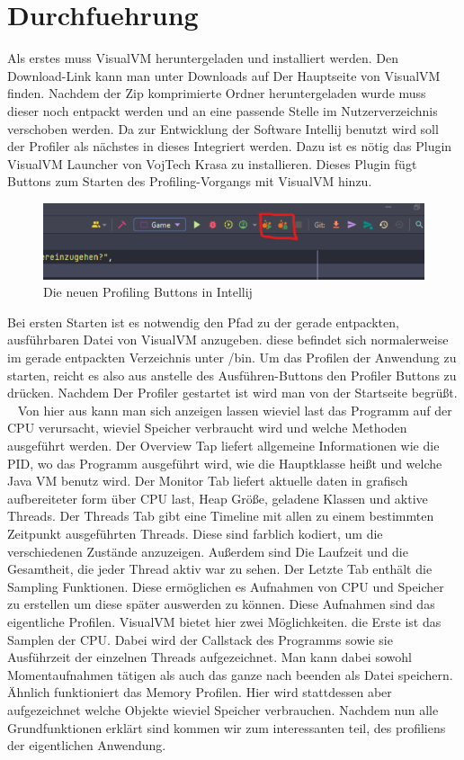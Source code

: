 \documentclass{article}
\begin{document}
\section{Durchfuehrung}
Als erstes muss VisualVM heruntergeladen und installiert werden. Den Download-Link kann man unter Downloads auf Der Hauptseite von VisualVM finden. Nachdem der Zip komprimierte Ordner heruntergeladen wurde muss dieser noch entpackt werden und an eine passende Stelle im Nutzerverzeichnis verschoben werden. Da zur Entwicklung der Software Intellij benutzt wird soll der Profiler als nächstes in dieses Integriert werden. Dazu ist es nötig das Plugin VisualVM Launcher von VojTech Krasa zu installieren. Dieses Plugin fügt Buttons zum Starten des Profiling-Vorgangs mit VisualVM hinzu. ~\cite{fig:Intellij_VisualVM_Button}
\begin{figure}[t]
  \centering
  \includegraphics{Intellij_VisualVM_Button}
  \caption{Die neuen Profiling Buttons in Intellij}
  \label{fig:Intellij_VisualVM_Button}
\end{figure}
Bei ersten Starten ist es notwendig den Pfad zu der gerade entpackten, ausführbaren Datei von VisualVM anzugeben. diese befindet sich normalerweise im gerade entpackten Verzeichnis unter /bin. Um das Profilen der Anwendung zu starten, reicht es also aus anstelle des Ausführen-Buttons den Profiler Buttons zu drücken. Nachdem Der Profiler gestartet ist wird man von der Startseite begrüßt. ~\cite{fig:VisualVM_MainPage} Von hier aus kann man sich anzeigen lassen wieviel last das Programm auf der CPU verursacht, wieviel Speicher verbraucht wird und welche Methoden ausgeführt werden. Der Overview Tap liefert allgemeine Informationen wie die PID, wo das Programm ausgeführt wird, wie die Hauptklasse heißt und welche Java 
VM benutz wird. Der Monitor Tab liefert aktuelle daten in grafisch aufbereiteter form über CPU last, Heap Größe, geladene Klassen und aktive Threads.
Der Threads Tab gibt eine Timeline mit allen zu einem bestimmten Zeitpunkt ausgeführten Threads. Diese sind farblich kodiert, um die verschiedenen Zustände anzuzeigen. Außerdem sind Die Laufzeit und die Gesamtheit, die jeder Thread aktiv war zu sehen. Der Letzte Tab enthält die Sampling Funktionen. Diese ermöglichen es Aufnahmen von CPU und Speicher zu erstellen um diese später auswerden zu können. Diese Aufnahmen sind das eigentliche Profilen. VisualVM bietet hier zwei Möglichkeiten. die Erste ist das Samplen der CPU. Dabei wird der Callstack des Programms sowie sie Ausführzeit der einzelnen Threads aufgezeichnet. Man kann dabei sowohl Momentaufnahmen tätigen als auch das ganze nach beenden als Datei speichern. Ähnlich funktioniert das Memory Profilen. Hier wird stattdessen aber aufgezeichnet welche Objekte wieviel Speicher verbrauchen. Nachdem nun alle Grundfunktionen erklärt sind kommen wir zum interessanten teil, des profiliens der eigentlichen Anwendung.
\end{document}
